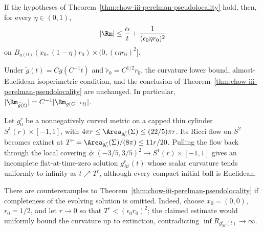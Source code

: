 \begin{corollary}
\label{cor:chow-iii-interior-curvature-estimate}
If the hypotheses of Theorem~\ref{thm:chow-iii-perelman-pseudolocality} hold,
then, for every \(\eta\in(0,1)\),
\[
|\Rm|\le\frac\alpha t+\frac1{(\epsilon_0\eta r_0)^2}
\]
on \(B_{g(0)}(x_0,(1-\eta)r_0)\times(0,(\epsilon\eta r_0)^2]\).
\end{corollary}

\begin{remark}
\label{rem:chow-iii-pseudolocality-scale-invariance}
Under \(\widetilde g(t)=Cg(C^{-1}t)\) and \(\widetilde r_0=C^{1/2}r_0\),
the curvature lower bound, almost-Euclidean isoperimetric condition, and
the conclusion of Theorem~\ref{thm:chow-iii-perelman-pseudolocality} are
unchanged.  In particular, \(|\Rm_{\widetilde g(t)}|=C^{-1}|\Rm_{g(C^{-1}t)}|\).
\end{remark}

\begin{example}
\label{ex:chow-iii-topping-incomplete-solution}
Let \(g_0^r\) be a nonnegatively curved metric on a capped thin cylinder
\(S^1(r)\times[-1,1]\), with
\(4\pi r\le\Area_{g_0^r}(\Sigma)\le(22/5)\pi r\).  Its Ricci flow on
\(S^2\) becomes extinct at \(T^r=\Area_{g_0^r}(\Sigma)/(8\pi)\le11r/20\).
Pulling the flow back through the local covering
\(\phi:(-3/5,3/5)^2\to S^1(r)\times[-1,1]\) gives an incomplete flat-at-time-zero
solution \(g_{\mathcal M}^r(t)\) whose scalar curvature tends uniformly to
infinity as \(t\nearrow T^r\), although every compact initial ball is Euclidean.
\end{example}

\begin{theorem}[Topping]
\label{thm:chow-iii-topping-counterexample}
There are counterexamples to Theorem~\ref{thm:chow-iii-perelman-pseudolocality}
if completeness of the evolving solution is omitted.  Indeed, choose
\(x_0=(0,0)\), \(r_0=1/2\), and let \(r\to0\) so that \(T^r<
(\epsilon_0r_0)^2\); the claimed estimate would uniformly bound the curvature
up to extinction, contradicting \(\inf R_{g_{\mathcal M}^r(t)}\to\infty\).
\end{theorem}

